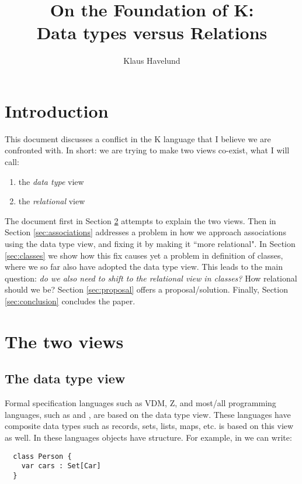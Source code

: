 \documentclass{llncs}
\title{On the Foundation of K:\\Data types versus Relations}
\author{Klaus Havelund}
\institute{
  Jet Propulsion Laboratory\\
  California Institute of Technology\\
  California, USA
}
\begin{document}
\maketitle

\section{Introduction}

This document discusses a conflict in the K language that I believe we are
confronted with. In short: we are trying to make two views co-exist, what I 
will call:

\begin{enumerate}
 \item the {\em data type} view
 \item the {\em relational} view
\end{enumerate}

\noindent
The document first in Section \ref{sec:theviews} 
attempts to explain the two views. Then in Section 
\ref{sec:associations} addresses a problem in how we approach associations using the data type view, and fixing it by making it ``more relational". In Section \ref{sec:classes} we show how 
this fix causes yet a problem in definition of classes, 
where we so far also have adopted the data type view. This leads to
the main question: {\em do we also need to shift to the relational 
view in classes?} How relational should we be?
Section \ref{sec:proposal} offers a proposal/solution.
Finally, Section \ref{sec:conclusion} concludes the paper.

\section{The two views}
\label{sec:theviews}

\subsection{The data type view}


Formal specification languages such as VDM, Z, and most/all 
programming languages, such as \java{} and \scala{}, are based on the data type view. These languages have composite data types 
such as records, sets, lists, maps, etc. \klang{} is based on this view as well.
In these languages objects have structure. For example, in \scala{} we can write:

\sscala
\begin{lstlisting}
  class Person {
    var cars : Set[Car]
  }
\end{lstlisting}
\end{document}
